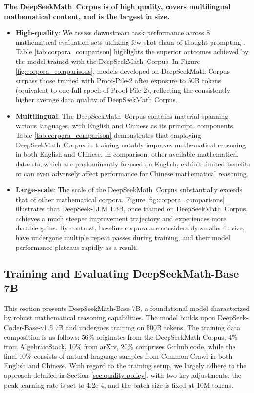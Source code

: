 \begin{itemize}[topsep=0pt]
\textbf{The DeepSeekMath~Corpus is of high quality, covers multilingual mathematical content, and is the largest in size.}

\begin{itemize}[topsep=0pt]
    \item \textbf{High-quality}:
    We assess downstream task performance across 8 mathematical evaluation sets utilizing few-shot chain-of-thought prompting \cite{cot}. Table \ref{tab:corpora_comparison} highlights the superior outcomes achieved by the model trained with the DeepSeekMath~Corpus. In Figure \ref{fig:corpora_comparisons}, models developed on DeepSeekMath Corpus surpass those trained with Proof-Pile-2 after exposure to 50B tokens (equivalent to one full epoch of Proof-Pile-2), reflecting the consistently higher average data quality of DeepSeekMath Corpus.
    \item \textbf{Multilingual}:
    The DeepSeekMath~Corpus contains material spanning various languages, with English and Chinese as its principal components. Table \ref{tab:corpora_comparison} demonstrates that employing DeepSeekMath~Corpus in training notably improves mathematical reasoning in both English and Chinese. In comparison, other available mathematical datasets, which are predominantly focused on English, exhibit limited benefits or can even adversely affect performance for Chinese mathematical reasoning.
    \item \textbf{Large-scale}:
    The scale of the DeepSeekMath~Corpus substantially exceeds that of other mathematical corpora. Figure \ref{fig:corpora_comparisons} illustrates that DeepSeek-LLM 1.3B, once trained on DeepSeekMath~Corpus, achieves a much steeper improvement trajectory and experiences more durable gains. By contrast, baseline corpora are considerably smaller in size, have undergone multiple repeat passes during training, and their model performance plateaus rapidly as a result.
\end{itemize}

\subsection{Training and Evaluating DeepSeekMath-Base 7B}

This section presents DeepSeekMath-Base 7B, a foundational model characterized by robust mathematical reasoning capabilities. The model builds upon DeepSeek-Coder-Base-v1.5 7B \citep{deepseek-coder} and undergoes training on 500B tokens. The training data composition is as follows: 56\% originates from the DeepSeekMath Corpus, 4\% from AlgebraicStack, 10\% from arXiv, 20\% comprises Github code, while the final 10\% consists of natural language samples from Common Crawl in both English and Chinese. With regard to the training setup, we largely adhere to the approach detailed in Section \ref{sec:quality-policy}, with two key adjustments: the peak learning rate is set to 4.2e-4, and the batch size is fixed at 10M tokens.


\end{itemize}
